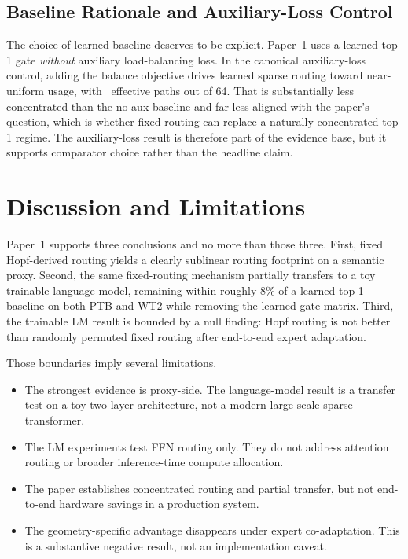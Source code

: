 \documentclass[10pt,twocolumn]{article}
\begin{document}
\subsection{Baseline Rationale and Auxiliary-Loss Control}
\label{sec:baseline-rationale}
The choice of learned baseline deserves to be explicit. Paper~1 uses a learned top-1 gate \emph{without} auxiliary load-balancing loss. In the canonical auxiliary-loss control, adding the balance objective drives learned sparse routing toward near-uniform usage, with \PaperAuxSparseEff\ effective paths out of 64. That is substantially less concentrated than the no-aux baseline and far less aligned with the paper's question, which is whether fixed routing can replace a naturally concentrated top-1 regime. The auxiliary-loss result is therefore part of the evidence base, but it supports comparator choice rather than the headline claim.

\section{Discussion and Limitations}
Paper~1 supports three conclusions and no more than those three. First, fixed Hopf-derived routing yields a clearly sublinear routing footprint on a semantic proxy. Second, the same fixed-routing mechanism partially transfers to a toy trainable language model, remaining within roughly $8\%$ of a learned top-1 baseline on both PTB and WT2 while removing the learned gate matrix. Third, the trainable LM result is bounded by a null finding: Hopf routing is not better than randomly permuted fixed routing after end-to-end expert adaptation.

Those boundaries imply several limitations.
\begin{itemize}
\item The strongest evidence is proxy-side. The language-model result is a transfer test on a toy two-layer architecture, not a modern large-scale sparse transformer.
\item The LM experiments test FFN routing only. They do not address attention routing or broader inference-time compute allocation.
\item The paper establishes concentrated routing and partial transfer, but not end-to-end hardware savings in a production system.
\item The geometry-specific advantage disappears under expert co-adaptation. This is a substantive negative result, not an implementation caveat.
\end{itemize}
\end{document}
